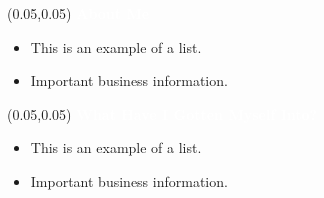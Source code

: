 \documentclass[aspectratio=169]{beamer} %
\begin{document}
\begin{frame}{}
    \setlength{\TPHorizModule}{\textwidth}
    \setlength{\TPVertModule}{\textwidth}
    \begin{textblock}{0.74}(0.05,0.05)
        \bfseries\large\textcolor{white}{About Me}
    \end{textblock}
    \begin{itemize}
        \item This is an example of a list.
        \item Important business information.
    \end{itemize}
\end{frame}

\begin{frame}{}
    \setlength{\TPHorizModule}{\textwidth}
    \setlength{\TPVertModule}{\textwidth}
    \begin{textblock}{0.74}(0.05,0.05)
        \bfseries\large\textcolor{white}{What Have I Gotten Myself Into?}
    \end{textblock}
    \begin{itemize}
        \item This is an example of a list.
        \item Important business information.
    \end{itemize}
\end{frame}
\end{document}
